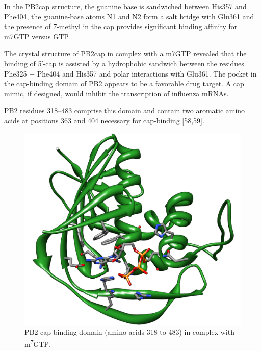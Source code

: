 In the PB2cap structure, the guanine base is sandwiched between His357 and Phe404, the guanine-base atoms N1 and N2 form a salt bridge with Glu361 and the presence of 7-methyl in the cap provides significant binding affinity for m7GTP versus GTP \citep{1192}.

The crystal structure of PB2cap in complex with a m7GTP revealed that the binding of 5′-cap is assisted by a hydrophobic sandwich between the residues Phe325 + Phe404 and His357 and polar interactions with Glu361. The pocket in the cap-binding domain of PB2 appears to be a favorable drug target. A cap mimic, if designed, would inhibit the transcription of influenza mRNAs.%

PB2 residues 318–483 comprise this domain and contain two aromatic amino acids at positions 363 and 404 necessary for cap-binding [58,59].

\begin{figure}
\centering
\includegraphics[width=\linewidth]{../influenza/2VQZ.png}
\caption{PB2 cap binding domain (amino acids 318 to 483) in complex with m\textsuperscript{7}GTP.}
\label{influenza:2VQZ}
\end{figure}

